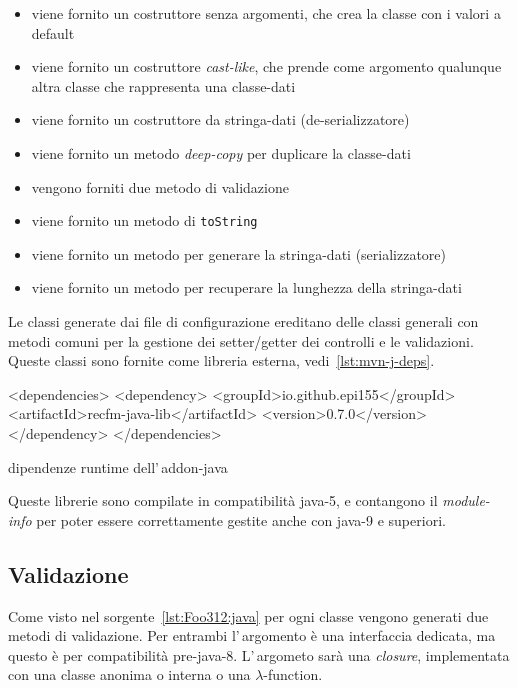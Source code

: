 \begin{itemize}
\item viene fornito un costruttore senza argomenti, che crea la classe con i 
    valori a default
\item viene fornito un costruttore \textit{cast-like}, che prende come argomento
    qualunque altra classe che rappresenta una classe-dati
\item viene fornito un costruttore da stringa-dati (de-serializzatore)
\item viene fornito un metodo \textit{deep-copy} per duplicare la classe-dati
\item vengono forniti due metodo di validazione
\item viene fornito un metodo di \texttt{toString}
\item viene fornito un metodo per generare la stringa-dati (serializzatore)
\item viene fornito un metodo per recuperare la lunghezza della stringa-dati
\end{itemize}

Le classi generate dai file di configurazione ereditano delle classi generali
con metodi comuni per la gestione dei setter/getter dei controlli e le 
validazioni. Queste classi sono fornite come libreria esterna, 
vedi~\ref{lst:mvn-j-deps}.

\begin{elisting}[!htb]
\begin{xmlcode}
<dependencies>
  <dependency>
    <groupId>io.github.epi155</groupId>
    <artifactId>recfm-java-lib</artifactId>
    <version>0.7.0</version>
  </dependency>
</dependencies>
\end{xmlcode}
\caption{dipendenze runtime dell'\,addon-java}
\label{lst:mvn-j-deps}
\end{elisting}

Queste librerie sono compilate in compatibilità java-5, e contangono il
\textsl{module-info} per poter essere correttamente gestite anche con java-9 e
superiori.

\subsection{Validazione}
Come visto nel sorgente~\ref{lst:Foo312:java} per ogni classe vengono generati
due metodi di validazione. Per entrambi l'\,argo\-men\-to è una interfaccia 
dedicata, ma questo è per compatibilità pre-java-8.
L'\,argometo sarà una \textit{closure}, implementata con una classe anonima o 
interna o una $\lambda$-function.

